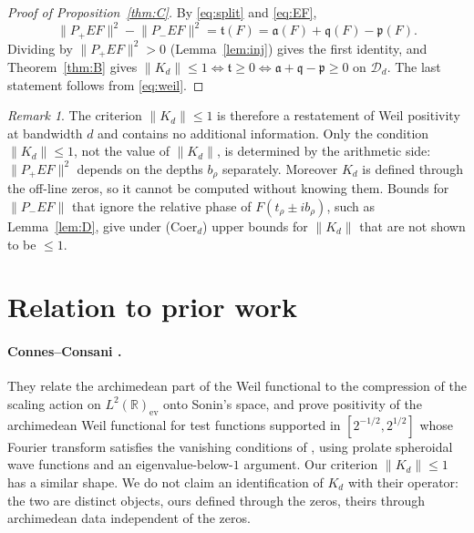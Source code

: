 \documentclass[11pt]{amsart}
\theoremstyle{definition}
\theoremstyle{remark}
\newtheorem{remark}[theorem]{Remark}
\newcommand{\tform}{\mathfrak t}
\newcommand{\rmar}{\mathfrak a}
\newcommand{\rmq}{\mathfrak q}
\newcommand{\rmp}{\mathfrak p}
\newcommand{\Kop}{K}
\newcommand{\Norm}[1]{\lVert #1 \rVert}
\begin{document}
\begin{proof}[Proof of Proposition~\ref{thm:C}]
By \eqref{eq:split} and \eqref{eq:EF},
\begin{equation}\label{eq:pivot}
\Norm{P_+EF}^{2}-\Norm{P_-EF}^{2}=\tform(F)=\rmar(F)+\rmq(F)-\rmp(F).
\end{equation}
Dividing by $\Norm{P_+EF}^{2}>0$ (Lemma~\ref{lem:inj}) gives the first identity, and
Theorem~\ref{thm:B} gives $\Norm{\Kop_d}\le1\iff\tform\ge0\iff\rmar+\rmq-\rmp\ge0$ on
$\mathcal D_d$. The last statement follows from \eqref{eq:weil}.
\end{proof}

\begin{remark}\label{cor:circular}
The criterion $\Norm{\Kop_d}\le1$ is therefore a restatement of Weil positivity at
bandwidth $d$ and contains no additional information. Only the condition
$\Norm{\Kop_d}\le1$, not the value of $\Norm{\Kop_d}$, is determined by the arithmetic side:
$\Norm{P_+EF}^{2}$ depends on the depths $b_\rho$ separately. Moreover $\Kop_d$ is defined
through the off-line zeros, so it cannot be computed without knowing them. Bounds for
$\Norm{P_-EF}$ that ignore the relative phase of $F(t_\rho\pm ib_\rho)$, such as
Lemma~\ref{lem:D}, give under (Coer$_d$) upper bounds for $\Norm{\Kop_d}$ that are not
shown to be $\le1$.
\end{remark}

\section{Relation to prior work}\label{sec:prior}

\paragraph{Connes--Consani \cite{ConnesConsani}.} They relate the archimedean part of the
Weil functional to the compression of the scaling action on $L^{2}(\mathbb
R)_{\mathrm{ev}}$ onto Sonin's space, and prove positivity of the archimedean Weil functional
for test functions supported in $[2^{-1/2},2^{1/2}]$ whose Fourier transform satisfies the
vanishing conditions of \cite[Thm.~1.1]{ConnesConsani}, using prolate spheroidal wave functions and an
eigenvalue-below-$1$ argument. Our criterion $\Norm{\Kop_d}\le1$ has a similar shape. We
do not claim an identification of $\Kop_d$ with their operator: the two are distinct
objects, ours defined through the zeros, theirs through archimedean data independent of
the zeros.
\end{document}
